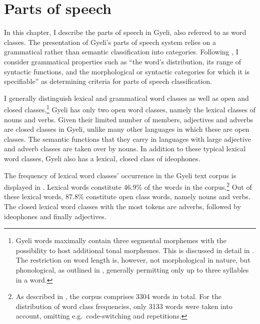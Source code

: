 \chapter{Parts of speech}
\label{sec:POS}


In this chapter, I describe the parts of speech in Gyeli, also referred to as word classes. The presentation of Gyeli's parts of speech system relies on a grammatical rather than semantic classification into categories. Following \citet[1-2]{schachter2007}, I consider grammatical properties such as ``the word’s distribution, its range of syntactic functions, and the morphological or syntactic categories for which it is specifiable'' as determining criteria for parts of speech classification. 

I generally distinguish lexical and grammatical word classes as well as open and closed classes.\footnote{Gyeli words maximally contain three segmental morphemes with the possibility to host additional tonal morphemes. This is discussed in detail in . The restriction on word length is, however, not morphological in nature, but phonological, as outlined in , generally permitting only up to three syllables in a word.}
Gyeli has only two open word classes, namely the lexical classes of nouns and verbs. Given their limited number of members, adjectives and adverbs are closed classes in Gyeli, unlike many other languages in which these are open classes. The semantic functions that they carry in languages with large adjective and adverb classes are taken over by nouns. In addition to these typical lexical word classes, Gyeli also has a lexical, closed class of ideophones. 

The frequency of lexical word classes' occurrence in the Gyeli text corpus is displayed in . Lexical words constitute 46.9\% of the words in the corpus.\footnote{As described in , the corpus comprises 3304 words in total. For the distribution of word class frequencies, only 3133 words were taken into account, omitting e.g.\ code-switching and repetitions.} Out of these lexical words, 87.8\% constitute open class words, namely nouns and verbs. The closed lexical word classes with the most tokens are adverbs, followed by ideophones and finally adjectives.


